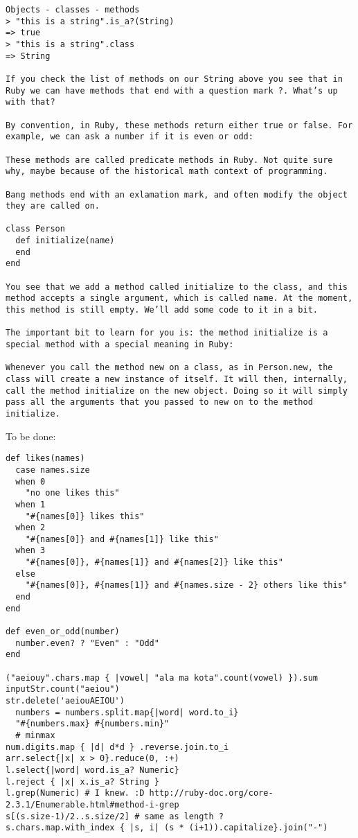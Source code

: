 \documentclass{charun}
\begin{document}
\begin{multicols*}{2}
\begin{verbatim}
Objects - classes - methods
> "this is a string".is_a?(String)
=> true
> "this is a string".class
=> String

If you check the list of methods on our String above you see that in Ruby we can have methods that end with a question mark ?. What’s up with that?

By convention, in Ruby, these methods return either true or false. For example, we can ask a number if it is even or odd:

These methods are called predicate methods in Ruby. Not quite sure why, maybe because of the historical math context of programming.

Bang methods end with an exlamation mark, and often modify the object they are called on. 

class Person
  def initialize(name)
  end
end

You see that we add a method called initialize to the class, and this method accepts a single argument, which is called name. At the moment, this method is still empty. We’ll add some code to it in a bit.

The important bit to learn for you is: the method initialize is a special method with a special meaning in Ruby:

Whenever you call the method new on a class, as in Person.new, the class will create a new instance of itself. It will then, internally, call the method initialize on the new object. Doing so it will simply pass all the arguments that you passed to new on to the method initialize.
\end{verbatim}

\end{multicols*}
To be done:
\begin{verbatim}
def likes(names)
  case names.size
  when 0 
    "no one likes this"
  when 1 
    "#{names[0]} likes this"
  when 2
    "#{names[0]} and #{names[1]} like this"
  when 3
    "#{names[0]}, #{names[1]} and #{names[2]} like this"
  else
    "#{names[0]}, #{names[1]} and #{names.size - 2} others like this"
  end
end

def even_or_odd(number)
  number.even? ? "Even" : "Odd"
end

("aeiouy".chars.map { |vowel| "ala ma kota".count(vowel) }).sum
inputStr.count("aeiou")
str.delete('aeiouAEIOU')
  numbers = numbers.split.map{|word| word.to_i}
  "#{numbers.max} #{numbers.min}"
  # minmax
num.digits.map { |d| d*d } .reverse.join.to_i
arr.select{|x| x > 0}.reduce(0, :+)
l.select{|word| word.is_a? Numeric}
l.reject { |x| x.is_a? String }
l.grep(Numeric) # I knew. :D http://ruby-doc.org/core-2.3.1/Enumerable.html#method-i-grep
s[(s.size-1)/2..s.size/2] # same as length ?
s.chars.map.with_index { |s, i| (s * (i+1)).capitalize}.join("-")

\end{verbatim}
\end{document}
